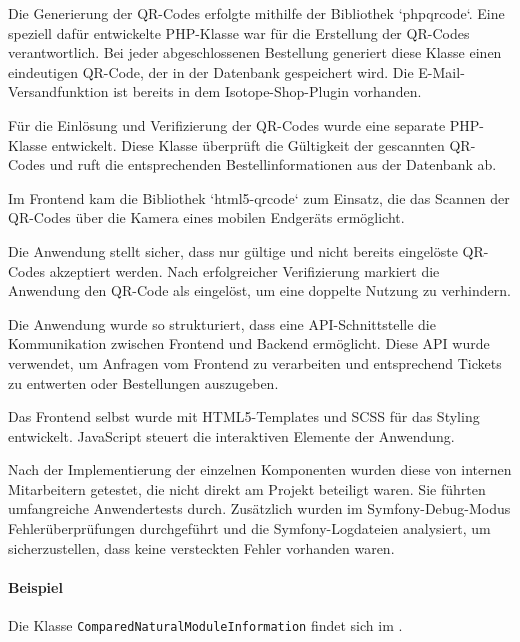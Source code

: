 Die Generierung der QR-Codes erfolgte mithilfe der Bibliothek `phpqrcode`. Eine speziell dafür entwickelte PHP-Klasse war für die Erstellung der QR-Codes verantwortlich. Bei jeder abgeschlossenen Bestellung generiert diese Klasse einen eindeutigen QR-Code, der in der Datenbank gespeichert wird. Die E-Mail-Versandfunktion ist bereits in dem Isotope-Shop-Plugin vorhanden.

Für die Einlösung und Verifizierung der QR-Codes wurde eine separate PHP-Klasse entwickelt. Diese Klasse überprüft die Gültigkeit der gescannten QR-Codes und ruft die entsprechenden Bestellinformationen aus der Datenbank ab.

Im Frontend kam die Bibliothek `html5-qrcode` zum Einsatz, die das Scannen der QR-Codes über die Kamera eines mobilen Endgeräts ermöglicht.

Die Anwendung stellt sicher, dass nur gültige und nicht bereits eingelöste QR-Codes akzeptiert werden. Nach erfolgreicher Verifizierung markiert die Anwendung den QR-Code als eingelöst, um eine doppelte Nutzung zu verhindern.

Die Anwendung wurde so strukturiert, dass eine API-Schnittstelle die Kommunikation zwischen Frontend und Backend ermöglicht. Diese API wurde verwendet, um Anfragen vom Frontend zu verarbeiten und entsprechend Tickets zu entwerten oder Bestellungen auszugeben. 

Das Frontend selbst wurde mit HTML5-Templates und SCSS für das Styling entwickelt. JavaScript steuert die interaktiven Elemente der Anwendung.

Nach der Implementierung der einzelnen Komponenten wurden diese von internen Mitarbeitern getestet, die nicht direkt am Projekt beteiligt waren. Sie führten umfangreiche Anwendertests durch.
Zusätzlich wurden im Symfony-Debug-Modus Fehlerüberprüfungen durchgeführt und die Symfony-Logdateien analysiert, um sicherzustellen, dass keine versteckten Fehler vorhanden waren.

\paragraph{Beispiel}
Die Klasse \texttt{Com\-par\-ed\-Na\-tu\-ral\-Mo\-dule\-In\-for\-ma\-tion} findet sich im .  
